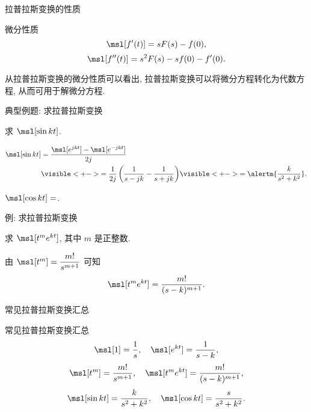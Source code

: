 \begin{frame}{拉普拉斯变换的性质}
	\onslide<+->
	\begin{algorithm}{微分性质}
		\[\msl[f'(t)]=sF(s)-f(0),\]
		\[\msl[f''(t)]=s^2F(s)-sf(0)-f'(0).\]
	\end{algorithm}

	\onslide<+->
	从拉普拉斯变换的微分性质可以看出, 拉普拉斯变换可以将微分方程转化为代数方程, 从而可用于解微分方程.
\end{frame}


\begin{frame}{典型例题: 求拉普拉斯变换}
	\onslide<+->
	\begin{example}
		求 $\msl[\sin{kt}]$.
	\end{example}

	\onslide<+->
	\begin{solution}
		\begin{align*}
			\msl[\sin{kt}]&=\frac{\msl[e^{jkt}]-\msl[e^{-jkt}]}{2j}\\
			&\visible<+->{=\frac1{2j}\left(\frac1{s-jk}-\frac1{s+jk}\right)}
			\visible<+->{=\alertm{\frac k{s^2+k^2}}.}
		\end{align*}
	\end{solution}

	\onslide<+->
	\begin{exercise}
		$\msl[\cos{kt}]=$.
	\end{exercise}
\end{frame}


\begin{frame}{例: 求拉普拉斯变换}
	\onslide<+->
	\begin{example}
		求 $\msl[t^me^{kt}]$, 其中 $m$ 是正整数.
	\end{example}

	\onslide<+->
	\begin{solution}
		由 $\msl[t^m]=\dfrac{m!}{s^{m+1}}$ 可知
		\[\msl[t^me^{kt}]=\frac{m!}{(s-k)^{m+1}}.\]
	\end{solution}
\end{frame}


\begin{frame}{常见拉普拉斯变换汇总}
	\onslide<+->
	\begin{algorithm}{常见拉普拉斯变换汇总}
		\[\msl[1]=\frac1s,\quad \msl[e^{kt}]=\frac1{s-k},\]
		\[\msl[t^m]=\frac{m!}{s^{m+1}},\quad \msl[t^me^{kt}]=\frac{m!}{(s-k)^{m+1}},\]
		\[\msl[\sin kt]=\frac{k}{s^2+k^2},\quad
		\msl[\cos kt]=\frac{s}{s^2+k^2}.\]
	\end{algorithm}
\end{frame}


